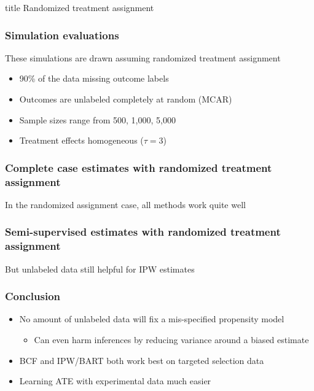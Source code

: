 \documentclass[compress]{beamer}
\begin{document}
\begin{frame}
\vfill
\centering
\begin{beamercolorbox}[sep=8pt,center,shadow=true,rounded=true]{title}
Randomized treatment assignment\par
\end{beamercolorbox}
\vfill
\end{frame}

\begin{frame} \frametitle{Simulation evaluations}
These simulations are drawn assuming randomized treatment assignment

\begin{itemize}
	\item 90\% of the data missing outcome labels
	\item Outcomes are unlabeled completely at random (MCAR)
	\item Sample sizes range from 500, 1,000, 5,000
	\item Treatment effects homogeneous ($\tau=3$)
\end{itemize}

\transboxin
\end{frame}

\begin{frame} \frametitle{Complete case estimates with randomized treatment assignment}
In the randomized assignment case, all methods work quite well



\transboxin
\end{frame}

\begin{frame} \frametitle{Semi-supervised estimates with randomized treatment assignment}
But unlabeled data still helpful for IPW estimates



\transboxin
\end{frame}

\begin{frame} \frametitle{Conclusion}
 \begin{itemize}
  \item No amount of unlabeled data will fix a mis-specified propensity model
  \begin{itemize}
  \item Can even harm inferences by reducing variance around a biased estimate
  \end{itemize}
  \item BCF and IPW/BART both work best on targeted selection data
  \item Learning ATE with experimental data much easier
 \end{itemize}
\transboxin
\end{frame}
\end{document}
